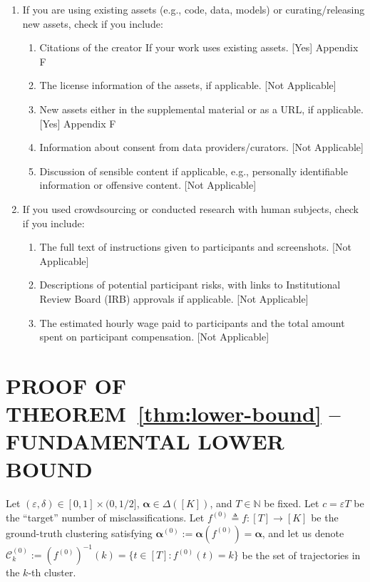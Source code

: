 \documentclass[twoside]{article}
\def\gC{{\mathcal{C}}}
\def\sN{{\mathbb{N}}}
\theoremstyle{plain}
\begin{document}
\begin{enumerate}
  \item If you are using existing assets (e.g., code, data, models) or curating/releasing new assets, check if you include:
  \begin{enumerate}
    \item Citations of the creator If your work uses existing assets. [Yes] Appendix F
    \item The license information of the assets, if applicable. [Not Applicable]
    \item New assets either in the supplemental material or as a URL, if applicable. [Yes] Appendix F
    \item Information about consent from data providers/curators. [Not Applicable]
    \item Discussion of sensible content if applicable, e.g., personally identifiable information or offensive content. [Not Applicable]
  \end{enumerate}

  \item If you used crowdsourcing or conducted research with human subjects, check if you include:
  \begin{enumerate}
    \item The full text of instructions given to participants and screenshots. [Not Applicable]
    \item Descriptions of potential participant risks, with links to Institutional Review Board (IRB) approvals if applicable. [Not Applicable]
    \item The estimated hourly wage paid to participants and the total amount spent on participant compensation. [Not Applicable]
  \end{enumerate}

\end{enumerate}




\clearpage
\appendix
\thispagestyle{empty}

\onecolumn

\tableofcontents
\newpage

\section{\texorpdfstring{PROOF OF THEOREM~\ref{thm:lower-bound} -- FUNDAMENTAL LOWER BOUND}{PROOF OF THEOREM 3.1 -- FUNDAMENTAL LOWER BOUND}}
\label{app:lower-bound}
Let $(\varepsilon, \delta) \in [0, 1] \times (0, 1/2]$, $\bm\alpha \in \Delta([K])$, and $T \in \sN$ be fixed.
Let $c = \varepsilon T$ be the ``target'' number of misclassifications.
Let $f^{(0)} \triangleq f : [T] \rightarrow [K]$ be the ground-truth clustering satisfying $\bm\alpha^{(0)} := \bm\alpha(f^{(0)}) = \bm\alpha$, and let us denote $\gC_k^{(0)} := (f^{(0)})^{-1}(k) = \{ t \in [T] : f^{(0)}(t) = k \}$ be the set of trajectories in the $k$-th cluster.
\end{document}
